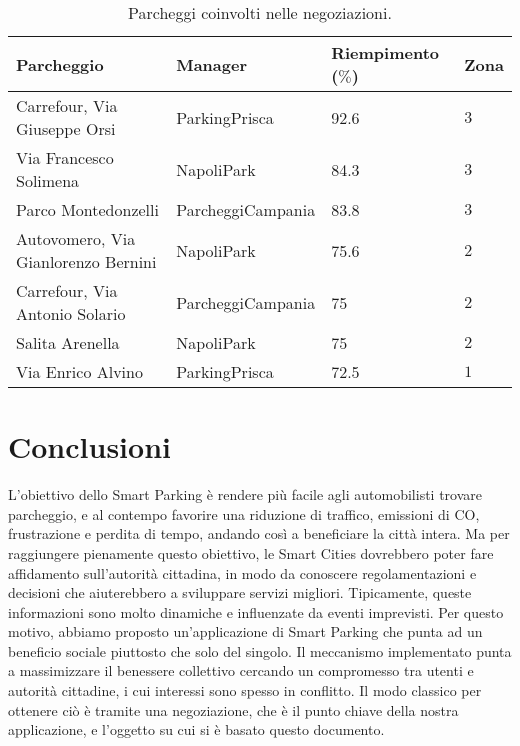 \documentclass[11pt,a4paper,twoside]{article}
\numberwithin{figure}{section}
\numberwithin{equation}{section}
\begin{document}
\begin{table}[ht]
    \centering
    \begin{tabular}{llll}
    \arrayrulecolor{gray}
    \toprule
    Parcheggio & Manager & Riempimento ($\%$) & Zona \\ 
    \midrule
    Carrefour, Via Giuseppe Orsi & \textsf{ParkingPrisca} & 92.6 & $3$ \\
    Via Francesco Solimena & \textsf{NapoliPark} & 84.3 & $3$ \\
    Parco Montedonzelli & \textsf{ParcheggiCampania} & 83.8 & $3$ \\
    Autovomero, Via Gianlorenzo Bernini & \textsf{NapoliPark} & 75.6 & $2$ \\
    Carrefour, Via Antonio Solario & \textsf{ParcheggiCampania} & 75 & $2$ \\ 
    Salita Arenella & \textsf{NapoliPark} & 75 & $2$ \\ 
    Via Enrico Alvino & \textsf{ParkingPrisca} & 72.5 & $1$ \\
    \bottomrule
    \end{tabular}
    \label{tab:2}
    \caption{Parcheggi coinvolti nelle negoziazioni.}
\end{table}

\section{Conclusioni}

L'obiettivo dello Smart Parking è rendere più facile agli automobilisti trovare parcheggio, e al contempo favorire una riduzione di traffico, emissioni di CO, frustrazione e perdita di tempo, andando così a beneficiare la città intera.
Ma per raggiungere pienamente questo obiettivo, le Smart Cities dovrebbero poter fare affidamento sull'autorità cittadina, in modo da conoscere regolamentazioni e decisioni che aiuterebbero a sviluppare servizi migliori.
Tipicamente, queste informazioni sono molto dinamiche e influenzate da eventi imprevisti.
Per questo motivo, abbiamo proposto un'applicazione di Smart Parking che punta ad un beneficio sociale piuttosto che solo del singolo.
Il meccanismo implementato punta a massimizzare il benessere collettivo cercando un compromesso tra utenti e autorità cittadine, i cui interessi sono spesso in conflitto.
Il modo classico per ottenere ciò è tramite una negoziazione, che è il punto chiave della nostra applicazione, e l'oggetto su cui si è basato questo documento.

\nocite{*}

\renewcommand\refname{Riferimenti}

\end{document}

